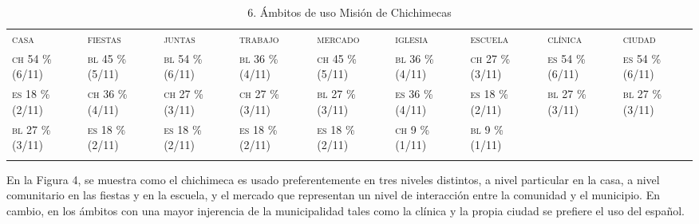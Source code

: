 \documentclass[output=paper]{../langscibook}
\begin{document}
\begin{table}
\caption{\label{tab:guerrero}6. Ámbitos de uso Misión de Chichimecas}


\begin{tabularx}{\textwidth}{XXXXXXXXX}
\lsptoprule
{\textsc{casa}} & {\textsc{fiestas}} & {\textsc{juntas}} & {\textsc{trabajo}} & {\textsc{mercado}} & {\textsc{iglesia}} & {\textsc{escuela}} & {\textsc{clínica}} & {\textsc{ciudad}}\\
{\textsc{ch} \textsc{54} \textsc{\%} \textsc{(6/11)}} & {\textsc{bl} \textsc{45} \textsc{\%} \textsc{(5/11)}} & {\textsc{bl} \textsc{54} \textsc{\%} \textsc{(6/11)}} & {\textsc{bl} \textsc{36} \textsc{\%} \textsc{(4/11)}} & {\textsc{ch} \textsc{45} \textsc{\%} \textsc{(5/11)}} & {\textsc{bl} \textsc{36} \textsc{\%} \textsc{(4/11)}} & {\textsc{ch} \textsc{27} \textsc{\%} \textsc{(3/11)}} & {\textsc{es} \textsc{54} \textsc{\%} \textsc{(6/11)}} & {\textsc{es} \textsc{54} \textsc{\%} \textsc{(6/11)}}\\
{\textsc{es} \textsc{18} \textsc{\%} \textsc{(2/11)}} & {\textsc{ch} \textsc{36} \textsc{\%} \textsc{(4/11)}} & {\textsc{ch} \textsc{27} \textsc{\%} \textsc{(3/11)}} & {\textsc{ch} \textsc{27} \textsc{\%} \textsc{(3/11)}} & {\textsc{bl} \textsc{27} \textsc{\%} \textsc{(3/11)}} & {\textsc{es} \textsc{36} \textsc{\%} \textsc{(4/11)}} & {\textsc{es} \textsc{18} \textsc{\%} \textsc{(2/11)}} & {\textsc{bl} \textsc{27} \textsc{\%} \textsc{(3/11)}} & {\textsc{bl} \textsc{27} \textsc{\%} \textsc{(3/11)}}\\
{\textsc{bl} \textsc{27} \textsc{\%} \textsc{(3/11)}} & {\textsc{es} \textsc{18} \textsc{\%} \textsc{(2/11)}} & {\textsc{es} \textsc{18} \textsc{\%} \textsc{(2/11)}} & {\textsc{es} \textsc{18} \textsc{\%} \textsc{(2/11)}} & {\textsc{es} \textsc{18} \textsc{\%} \textsc{(2/11)}} & {\textsc{ch} \textsc{9} \textsc{\%} \textsc{(1/11)}} & {\textsc{bl} \textsc{9} \textsc{\%} \textsc{(1/11)}} &  & \\
\lspbottomrule
\end{tabularx}
\end{table}

En la Figura 4, se muestra como el chichimeca es usado preferentemente en tres niveles distintos, a nivel particular en la casa, a nivel comunitario en las fiestas y en la escuela, y el mercado que representan un nivel de interacción entre la comunidad y el municipio. En cambio, en los ámbitos con una mayor injerencia de la municipalidad tales como la clínica y la propia ciudad se prefiere el uso del español.
\end{document}
